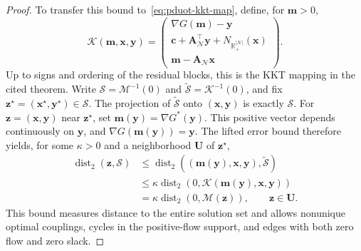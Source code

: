 \begin{proof}
To transfer this bound to~\eqref{eq:pduot-kkt-map}, define, for $\mathbf m>0$,
\begin{equation*}
\mathcal K(\mathbf m,\mathbf x,\mathbf y)=\begin{pmatrix}\nabla G(\mathbf m)-\mathbf y\\ \mathbf c+\mathbf A_{\mathcal N}^{\top}\mathbf y+N_{\mathbb R_+^{|\mathcal N|}}(\mathbf x)\\ \mathbf m-\mathbf A_{\mathcal N}\mathbf x\end{pmatrix}.
\end{equation*}
Up to signs and ordering of the residual blocks, this is the KKT mapping in the cited theorem.
Write $\mathcal S=\mathcal M^{-1}(0)$ and $\widetilde{\mathcal S}=\mathcal K^{-1}(0)$, and fix $\mathbf z^\star=(\mathbf x^\star,\mathbf y^\star)\in\mathcal S$.
The projection of $\widetilde{\mathcal S}$ onto $(\mathbf x,\mathbf y)$ is exactly $\mathcal S$.
For $\mathbf z=(\mathbf x,\mathbf y)$ near $\mathbf z^\star$, set $\mathbf m(\mathbf y)=\nabla G^*(\mathbf y)$.
This positive vector depends continuously on $\mathbf y$, and $\nabla G(\mathbf m(\mathbf y))=\mathbf y$.
The lifted error bound therefore yields, for some $\kappa>0$ and a neighborhood $\mathbf U$ of $\mathbf z^\star$,
\begin{equation}
\label{eq:pduot-kkt-error-bound}
\begin{aligned}
\operatorname{dist}_2(\mathbf z,\mathcal S)&\leq\operatorname{dist}_2((\mathbf m(\mathbf y),\mathbf x,\mathbf y),\widetilde{\mathcal S})\\
&\leq\kappa\operatorname{dist}_2(0,\mathcal K(\mathbf m(\mathbf y),\mathbf x,\mathbf y))\\
&=\kappa\operatorname{dist}_2(0,\mathcal M(\mathbf z)),\qquad \mathbf z\in\mathbf U.
\end{aligned}
\end{equation}
This bound measures distance to the entire solution set and allows nonunique optimal couplings, cycles in the positive-flow support, and edges with both zero flow and zero slack.


\end{proof}
